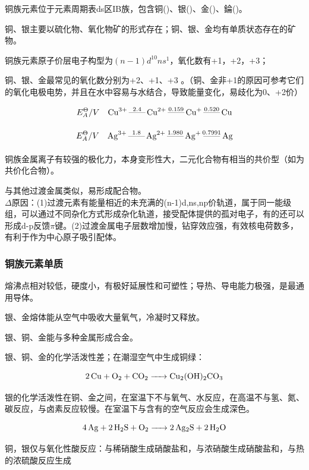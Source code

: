 \documentclass[a4paper,UTF8]{article}
\begin{document}
铜族元素位于元素周期表ds区IB族，包含铜()、银()、金()、錀()。

铜、银主要以硫化物、氧化物矿的形式存在；铜、银、金均有单质状态存在的矿物。

铜族元素原子价层电子构型为$(n-1)d^{10}ns^{1}$，氧化数有+1，+2，+3；

铜、银、金最常见的氧化数分别为+2、+1、+3 。（铜、金非+1的原因可参考它们的氧化电极电势，并且在水中容易与水结合，导致能量变化，易歧化为0、+2价）

$$ E^{\Theta}_{A}/V \quad \ce{Cu^{3+} \overset{2.4}{\text{------}} Cu^{2+} \overset{0.159}{\underset{}{\text{------}}} Cu+ \overset{0.520}{\underset{}{\text{------}}} Cu}$$

$$ E^{\Theta}_{A}/V  \quad \ce{Ag^{3+} \overset{1.8}{\underset{}{\text{------}}} Ag^{2+} \overset{1.980}{\underset{}{\text{------}}} Ag+ \overset{0.7991}{\underset{}{\text{------}}} Ag} $$




铜族金属离子有较强的极化力，本身变形性大，二元化合物有相当的共价型（如为共价化合物）。

与其他过渡金属类似，易形成配合物。\\$\Delta$原因：(1)过渡元素有能量相近的未充满的(n-1)d,ns,np价轨道，属于同一能级组，可以通过不同杂化方式形成杂化轨道，接受配体提供的孤对电子，有的还可以形成d-p反馈$\pi$键。(2)过渡金属电子层数增加慢，钻穿效应强，有效核电荷数多，有利于作为中心原子吸引配体。

\subsubsection{铜族元素单质}
熔沸点相对较低，硬度小，有极好延展性和可塑性；导热、导电能力极强，是最通用导体。

银、金熔体能从空气中吸收大量氧气，冷凝时又释放。

银、铜、金能与多种金属形成合金。

银、铜、金的化学活泼性差；在潮湿空气中生成铜绿：

$$ \ce{2Cu + O2 + CO2 -> Cu2(OH)2CO3} $$

银的化学活泼性在铜、金之间，在室温下不与氧气、水反应，在高温不与氢、氮、碳反应，与卤素反应较慢。在室温下与含有的空气反应会生成深色。

$$ \ce{4Ag + 2H2S + O2 -> 2Ag2S + 2H2O} $$

铜，银仅与氧化性酸反应：与稀硝酸生成硝酸盐和，与浓硝酸生成硝酸盐和，与热的浓硫酸反应生成
\end{document}
